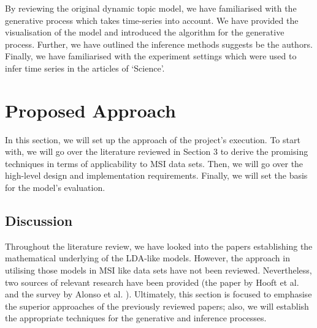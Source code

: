 \documentclass{mprop}
\begin{document}
\par By reviewing the original dynamic topic model, we have familiarised with the generative process which takes time-series into account. We have provided the visualisation of the model and introduced the algorithm for the generative process. Further, we have outlined the inference methods suggests be the authors. Finally, we have familiarised with the experiment settings which were used to infer time series in the articles of `Science'. 

\section{Proposed Approach}

\par In this section, we will set up the approach of the project's execution. To start with, we will go over the literature reviewed in Section 3 to derive the promising techniques in terms of applicability to MSI data sets. Then, we will go over the high-level design and implementation requirements. Finally, we will set the basis for the model's evaluation. 


\subsection{Discussion}

\par Throughout the literature review, we have looked into the papers establishing the mathematical underlying of the LDA-like models. However, the approach in utilising those models in MSI like data sets have not been reviewed. Nevertheless, two sources of relevant research have been provided (the paper by Hooft et al. \cite{hooft} and the survey by Alonso et al. \cite{alonso-et-al}). Ultimately, this section is focused to emphasise the superior approaches of the previously reviewed papers; also, we will establish the appropriate techniques for the generative and inference processes.
\end{document}
